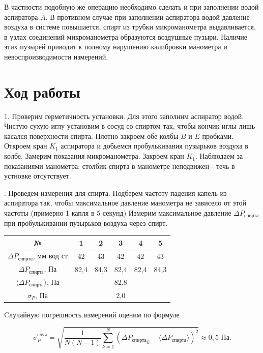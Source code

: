 \documentclass[a4paper,12pt]{article} %
\begin{document}
{\medskip

\noindent В частности подобную же операцию необходимо сделать и при заполнении водой аспиратора $A$. В противном случае при заполнении аспиратора водой давление воздуха в системе повышается, спирт из трубки микроманометра выдавливается, в узлах соединений микроманометра образуются воздушные пузыри. Наличие этих пузырей приводит к полному нарушению калибровки манометра и невоспроизводимости измерений.

\medskip

\section{Ход работы}

1. Проверим герметичность установки. Для этого заполним аспиратор водой. Чистую сухую иглу установим в сосуд со спиртом так, чтобы кончик иглы лишь касался поверхности спирта. Плотно закроем обе колбы $B$ и $E$ пробками. Откроем кран $K_{1}$ аспиратора и добьемся пробулькивания пузырьков воздуха в колбе. Замерим показания микроманометра. Закроем кран $K_{1}$. Наблюдаем за показаниями манометра: столбик спирта в манометре неподвижен - течь в устновке отсутствует.

\medskip
 

. Проведем измерения для спирта. Подберем частоту падения капель из аспиратора так, чтобы максимальное давление манометра не зависело от этой частоты (примерно 1 капля в 5 секунд) Измерим максимальное давление $\Delta P_{\text{спирта}}$ при  пробулькивании пузырьков воздуха через спирт.

\begin{tabular}{|c|c|c|c|c|c|}
\hline 
№ & 1 & 2 & 3 & 4 & 5 \\ 
\hline 
$\Delta{P_{\text{спирта}}}$, мм вод ст & 42 & 43 & 42 & 42 & 43 \\ 
\hline 
$\Delta{P_{\text{спирта}}}$, Па & 82,4 & 84,3 & 82,4 & 82,4 & 84,3 \\ 
\hline 
$\langle \Delta{P_{\text{спирта}}} \rangle$, Па & \multicolumn{5}{c|}{82,8} \\ 
\hline 
$ \sigma_{P} $, Па  & \multicolumn{5}{c|}{2,0} \\ 
\hline 
\end{tabular} 

\medskip

\noindent Cлучайную погрешность измерений оценим по формуле

\begin{equation}
\sigma_{P}^{\text{случ}} = \sqrt{\frac{1}{N(N-1)}\sum\limits_{k=1}^N\left(\Delta{P_{\text{спирта}}}_k-\langle \Delta{P_{\text{спирта}}} \rangle\right)^2} \approx 0,5 \text{ Па}.
\end{equation}

}
\end{document}
